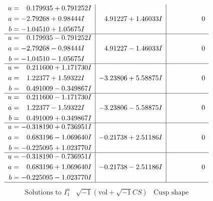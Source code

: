 \documentclass[1p]{elsarticle_modified}
\theoremstyle{definition}
\newcommand{\I}{\sqrt{-1}}
\begin{document}
$$\begin{array}{c|c|c}
\begin{aligned}
u &= \phantom{-}0.179935 + 0.791252 I \\
a &= -2.79268 + 0.98444 I \\
b &= -1.04510 + 1.05675 I\end{aligned}
 & \phantom{-}4.91227 + 1.46033 I & \phantom{-0.000000 } 0 \\ \hline\begin{aligned}
u &= \phantom{-}0.179935 - 0.791252 I \\
a &= -2.79268 - 0.98444 I \\
b &= -1.04510 - 1.05675 I\end{aligned}
 & \phantom{-}4.91227 - 1.46033 I & \phantom{-0.000000 } 0 \\ \hline\begin{aligned}
u &= \phantom{-}0.211600 + 1.171730 I \\
a &= \phantom{-}1.22377 + 1.59322 I \\
b &= \phantom{-}0.491009 - 0.349867 I\end{aligned}
 & -3.23806 + 5.58875 I & \phantom{-0.000000 } 0 \\ \hline\begin{aligned}
u &= \phantom{-}0.211600 - 1.171730 I \\
a &= \phantom{-}1.22377 - 1.59322 I \\
b &= \phantom{-}0.491009 + 0.349867 I\end{aligned}
 & -3.23806 - 5.58875 I & \phantom{-0.000000 } 0 \\ \hline\begin{aligned}
u &= -0.318190 + 0.736951 I \\
a &= \phantom{-}0.683196 - 1.069640 I \\
b &= -0.225095 + 1.023770 I\end{aligned}
 & -0.21738 + 2.51186 I & \phantom{-0.000000 } 0 \\ \hline\begin{aligned}
u &= -0.318190 - 0.736951 I \\
a &= \phantom{-}0.683196 + 1.069640 I \\
b &= -0.225095 - 1.023770 I\end{aligned}
 & -0.21738 - 2.51186 I & \phantom{-0.000000 } 0\\
 \hline 
 \end{array}$$\newpage$$\begin{array}{c|c|c}  
\text{Solutions to }I^u_{1}& \I (\text{vol} + \sqrt{-1}CS) & \text{Cusp shape}\\
 \hline 
\begin{aligned}

\end{aligned}
\end{array}$$
\end{document}
